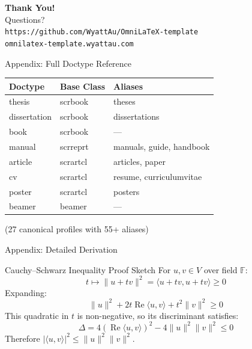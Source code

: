 \documentclass[doctype=beamer, beameraspectratio=169, beamertheme=Madrid, institution=generic]{omnilatex}
\begin{document}
\begin{frame}[plain,c]
  \vspace{2cm}
  {\huge\bfseries Thank You!}\\[1cm]
  {\large Questions?}\\[2cm]
  {\footnotesize
  \texttt{https://github.com/WyattAu/OmniLaTeX-template}\\
  \texttt{omnilatex-template.wyattau.com}
  }
\end{frame}


\appendix

\begin{frame}[allowframebreaks]{Appendix: Full Doctype Reference}
  \begin{table}
    \centering
    \begin{tabular}{l l l}
      \hline
      Doctype         & Base Class & Aliases \\
      \hline
      thesis          & scrbook    & theses \\
      dissertation    & scrbook    & dissertations \\
      book            & scrbook    & --- \\
      manual          & scrreprt   & manuals, guide, handbook \\
      article         & scrartcl   & articles, paper \\
      cv              & scrartcl   & resume, curriculumvitae \\
      poster          & scrartcl   & posters \\
      beamer          & beamer     & --- \\
      \hline
    \end{tabular}
  \end{table}
  (27 canonical profiles with 55+ aliases)
\end{frame}

\begin{frame}{Appendix: Detailed Derivation}
  \begin{block}{Cauchy--Schwarz Inequality Proof Sketch}
    For $u, v \in V$ over field $\mathbb{F}$:
    \[ t \mapsto \|u + tv\|^2 = \langle u + tv, u + tv \rangle \geq 0 \]
    Expanding:
    \[ \|u\|^2 + 2t \operatorname{Re}\langle u, v \rangle + t^2 \|v\|^2 \geq 0 \]
    This quadratic in $t$ is non-negative, so its discriminant satisfies:
    \[ \Delta = 4(\operatorname{Re}\langle u, v \rangle)^2 - 4\|u\|^2\|v\|^2 \leq 0 \]
    Therefore $|\langle u, v \rangle|^2 \leq \|u\|^2 \|v\|^2$.
  \end{block}
\end{frame}
\end{document}
